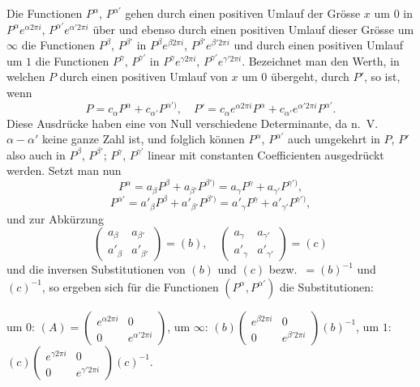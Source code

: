 \documentclass[12pt,a4paper]{book}
\theoremstyle{definition}
\theoremstyle{remark}
\begin{document}
Die Functionen $P^{\alpha}$, $P^{\alpha'}$ gehen durch einen positiven Umlauf der Grösse $x$ um $0$ in $P^{\alpha} e^{\alpha 2\pi i}$, $P^{\alpha'} e^{\alpha' 2\pi i}$ über und ebenso durch einen positiven Umlauf dieser Grösse um $\infty$ die Functionen $P^{\beta}$, $P^{\beta'}$ in $P^{\beta} e^{\beta 2\pi i}$, $P^{\beta'} e^{\beta' 2\pi i}$ und durch einen positiven Umlauf um $1$ die Functionen $P^{\gamma}$, $P^{\gamma'}$ in $P^{\gamma} e^{\gamma 2\pi i}$, $P^{\gamma'} e^{\gamma' 2\pi i}$. Bezeichnet man den Werth, in welchen $P$ durch einen positiven Umlauf von $x$ um $0$ übergeht, durch $P'$, so ist, wenn
\[
P = c_{\alpha} P^{\alpha} + c_{\alpha'} P^{\alpha')}, \quad P' = c_{\alpha} e^{\alpha 2\pi i} P^{\alpha} + c_{\alpha'} e^{\alpha' 2\pi i} P^{\alpha'}.
\]
Diese Ausdrücke haben eine von Null verschiedene Determinante, da n.\ V.\ $\alpha - \alpha'$ keine ganze Zahl ist, und folglich können $P^{\alpha}$, $P^{\alpha'}$ auch umgekehrt in $P$, $P'$ also auch in $P^{\beta}$, $P^{\beta'}$; $P^{\gamma}$, $P^{\gamma'}$ linear mit constanten Coefficienten ausgedrückt werden. Setzt man nun
\[
P^{\alpha} = a_{\beta} P^{\beta} + a_{\beta'} P^{\beta')} = a_{\gamma} P^{\gamma} + a_{\gamma'} P^{\gamma')},
\]
\[
P^{\alpha'} = a'_{\beta} P^{\beta} + a'_{\beta'} P^{\beta')} = a'_{\gamma} P^{\gamma} + a'_{\gamma'} P^{\gamma')},
\]
und zur Abkürzung
\[
\begin{pmatrix} a_{\beta} & a_{\beta'} \\ a'_{\beta} & a'_{\beta'} \end{pmatrix} = (b), \quad
\begin{pmatrix} a_{\gamma} & a_{\gamma'} \\ a'_{\gamma} & a'_{\gamma'} \end{pmatrix} = (c)
\]
und die inversen Substitutionen von $(b)$ und $(c)$ bezw.\ $= (b)^{-1}$ und $(c)^{-1}$, so ergeben sich für die Functionen $(P^{\alpha}, P^{\alpha'})$ die Substitutionen:

um $0$: $(A) = \begin{pmatrix} e^{\alpha 2\pi i} & 0 \\ 0 & e^{\alpha' 2\pi i} \end{pmatrix}$,
um $\infty$: $(b) \begin{pmatrix} e^{\beta 2\pi i} & 0 \\ 0 & e^{\beta' 2\pi i} \end{pmatrix} (b)^{-1}$,
um $1$: $(c) \begin{pmatrix} e^{\gamma 2\pi i} & 0 \\ 0 & e^{\gamma' 2\pi i} \end{pmatrix} (c)^{-1}$.
\end{document}
